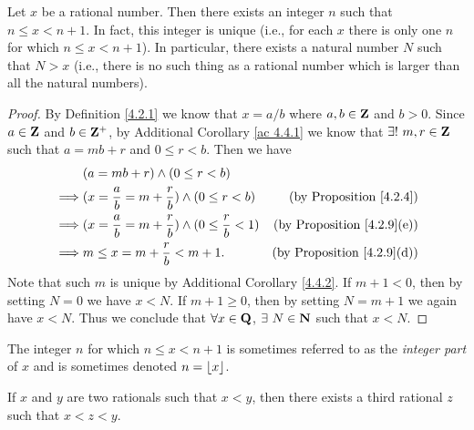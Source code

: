 \begin{proposition}\label{4.4.1}
    Let \(x\) be a rational number.
    Then there exists an integer \(n\) such that \(n \leq x < n + 1\).
    In fact, this integer is unique (i.e., for each \(x\) there is only one \(n\) for which \(n \leq x < n + 1\)).
    In particular, there exists a natural number \(N\) such that \(N > x\)
    (i.e., there is no such thing as a rational number which is larger than all the natural numbers).
\end{proposition}

\begin{proof}
    By Definition \ref{4.2.1} we know that \(x = a / b\) where \(a, b \in \mathbf{Z}\) and \(b > 0\).
    Since \(a \in \mathbf{Z}\) and \(b \in \mathbf{Z}^+\), by Additional Corollary \ref{ac 4.4.1} we know that \(\exists!\ m, r \in \mathbf{Z}\) such that \(a = mb + r\) and \(0 \leq r < b\).
    Then we have
    \begin{align*}
                 & (a = mb + r) \land (0 \leq r < b)                                                                           \\
        \implies & (x = \frac{a}{b} = m + \frac{r}{b}) \land (0 \leq r < b)           & \text{(by Proposition \ref{4.2.4})}    \\
        \implies & (x = \frac{a}{b} = m + \frac{r}{b}) \land (0 \leq \frac{r}{b} < 1) & \text{(by Proposition \ref{4.2.9}(e))} \\
        \implies & m \leq x = m + \frac{r}{b} < m + 1.                                & \text{(by Proposition \ref{4.2.9}(d))}
    \end{align*}
    Note that such \(m\) is unique by Additional Corollary \ref{4.4.2}.
    If \(m + 1 < 0\), then by setting \(N = 0\) we have \(x < N\).
    If \(m + 1 \geq 0\), then by setting \(N = m + 1\) we again have \(x < N\).
    Thus we conclude that \(\forall x \in \mathbf{Q}\), \(\exists\ N \in \mathbf{N}\) such that \(x < N\).
\end{proof}

\begin{remark}\label{4.4.2}
    The integer \(n\) for which \(n \leq x < n + 1\) is sometimes referred to as the \emph{integer part} of \(x\) and is sometimes denoted \(n = \left\lfloor x\right\rfloor\).
\end{remark}

\begin{proposition}\label{4.4.3}
    If \(x\) and \(y\) are two rationals such that \(x < y\), then there exists a third rational \(z\) such that \(x < z < y\).
\end{proposition}

